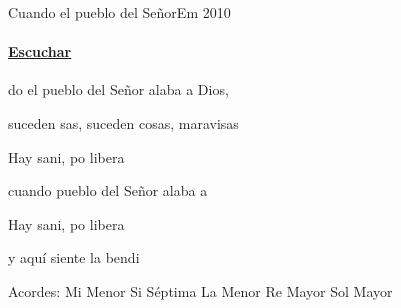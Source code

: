 \documentclass[12pt, spanish]{book}
\begin{document}
    \begin{song}{Cuando el pueblo del Señor}{Em}
    {2010} %
    {}
    {} %
    {}
        \ifChordBk
         \paragraph{\mbox{}\hfill\protect\href{https://open.spotify.com/intl-es/track/6LtCguSob2Jdc9GJOFEDVC}{Escuchar}\mbox{}\hfill}
        \fi

        \begin{SBOpGroup}
            do el pueblo del Señor alaba a Dios,

            suceden sas, suceden cosas, maravisas
        \end{SBOpGroup}

        \begin{SBChorus}
            Hay sani, po libera

            cuando  pueblo del Señor alaba a 

            Hay sani, po libera

            y aquí  siente la bendi
        \end{SBChorus}

        \ifChordBk
        \begin{SBOpGroup}
            Acordes:
            \upchord{\Em}\qquad Mi Menor \hfill
            \upchord{\Bseven}\qquad Si S\'eptima \hfill\null\break
            \upchord{\Am}\qquad La Menor \hfill
            \upchord{\D}\qquad Re Mayor \hfill
            \upchord{\G}\qquad Sol Mayor \hfill\null\break
        \end{SBOpGroup}
        \fi
    \end{song}
\end{document}
